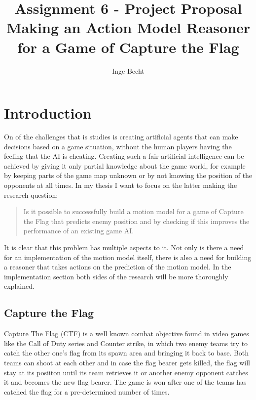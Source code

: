 \documentclass[a4paper, 12pt]{article}
\author{Inge Becht}
\title{Assignment 6 - Project Proposal\\ 
 Making an Action Model Reasoner for a Game of Capture the Flag}
\begin{document}
\maketitle

\section{Introduction}
On of the challenges that is studies is creating artificial agents that can make
decisions based on a game situation, without the human players having the
feeling that the AI is cheating. Creating such a fair artificial intelligence can be achieved by
giving it only partial knowledge about the game world, for example by keeping parts of
the game map unknown or by not knowing the position of the opponents at all
times. In my thesis I want to focus on the latter making the research question:
\begin{quotation}
Is it possible to
successfully build a motion model for a game of Capture the Flag that
predicts enemy position and by checking if this improves the performance
of an existing game AI.
\end{quotation}
It is clear that this problem has multiple aspects to it. Not
only is there a need for an implementation of the motion model itself, there is
also a need for building a reasoner that takes actions on the prediction of the
motion model. In the implementation section both sides of the research will be
more thoroughly explained. 

\subsection{Capture the Flag}
Capture The Flag (CTF) is a well known combat objective found in video games
like the Call of Duty series and Counter strike, in which two enemy teams try to
catch the other one's flag from its spawn area and bringing it back to base.
Both teams can shoot at each other and in case the flag bearer gets killed, the
flag will stay at its posiiton until its team retrieves it or another enemy
opponent catches it and becomes the new flag bearer. The game is won after one
of the teams has catched the flag for a pre-determined number of times.

\end{document}
